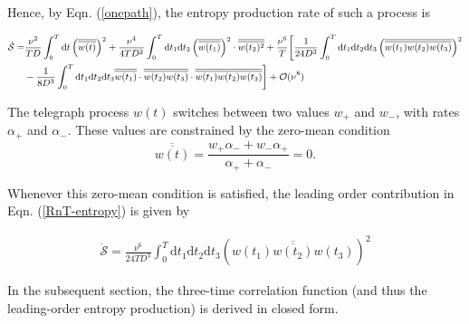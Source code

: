 \documentclass[%
 amsmath,amssymb,
]{revtex4-2}
\newcommand{\Overline}[1]{\overline{\overline{#1}}}
\newcommand{\rmd}[0]{\mathrm{d}}
\begin{document}
Hence, by Eqn. (\ref{onepath}), the entropy production rate of such a process is

\begin{widetext}
\begin{equation}\label{RnT-entropy}\small
\begin{split}
 \dot{\mathcal{S}}= & \frac{\nu^2}{TD}\int_0^T\rmd t\left(\Overline{w(t)}\right)^2 +  \frac{\nu^4}{4TD^2} \int_0^T \rmd t_1 \rmd t_2 \left(\Overline{w(t_1)}\right)^2\cdot\Overline{w(t_2)^2} + \frac{\nu^6}{T} \bigg[\frac{1}{24D^3}\int_0^T \rmd t_1 \rmd t_2 \rmd t_3 \left(\Overline{w(t_1)w(t_2)w(t_3)}\right)^2\\
  &- \frac{1}{8D^3}\int_0^T \rmd t_1 \rmd t_2 \rmd t_3 \Overline{w(t_1)}\cdot \Overline{w(t_2)w(t_3)}\cdot\Overline{w(t_1)w(t_2)w(t_3)}\bigg] + \mathcal{O}(\nu^8)
\end{split}
\end{equation}
\end{widetext}



The telegraph process $w(t)$ switches between two values $w_+$ and $w_-$, with rates $\alpha_+$ and $\alpha_-$. These values are constrained by the zero-mean condition
\begin{equation}\label{zeromean}
    \Overline{w(t)} = \frac{w_+\alpha_- + w_-\alpha_+}{\alpha_+ + \alpha_-} = 0.
\end{equation}

Whenever this zero-mean condition is satisfied, the leading order contribution in Eqn. (\ref{RnT-entropy}) is given by

\begin{equation}\label{telEP}
\begin{split}
\boxed{
 \dot{\mathcal{S}}=  \frac{\nu^6}{24T D^3}\int_0^T\rmd t_1\rmd t_2\rmd t_3\left(\Overline{w(t_1)w(t_2)w(t_3)}\right)^2 }
\end{split}
\end{equation}


In the subsequent section, the three-time correlation function (and thus the leading-order entropy production) is derived in closed form.
\end{document}
